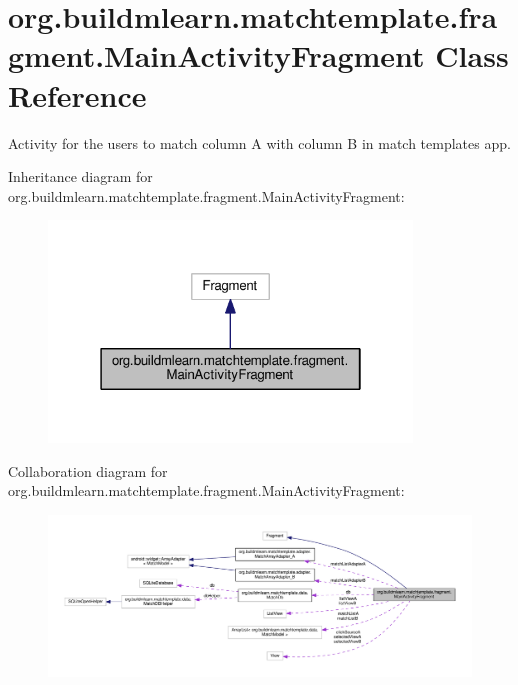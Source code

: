 \hypertarget{classorg_1_1buildmlearn_1_1matchtemplate_1_1fragment_1_1MainActivityFragment}{}\section{org.\+buildmlearn.\+matchtemplate.\+fragment.\+Main\+Activity\+Fragment Class Reference}
\label{classorg_1_1buildmlearn_1_1matchtemplate_1_1fragment_1_1MainActivityFragment}


Activity for the users to match column A with column B in match template\textquotesingle{}s app.  




Inheritance diagram for org.\+buildmlearn.\+matchtemplate.\+fragment.\+Main\+Activity\+Fragment\+:
\nopagebreak
\begin{figure}[H]
\begin{center}
\leavevmode
\includegraphics[width=274pt]{classorg_1_1buildmlearn_1_1matchtemplate_1_1fragment_1_1MainActivityFragment__inherit__graph}
\end{center}
\end{figure}


Collaboration diagram for org.\+buildmlearn.\+matchtemplate.\+fragment.\+Main\+Activity\+Fragment\+:
\nopagebreak
\begin{figure}[H]
\begin{center}
\leavevmode
\includegraphics[width=350pt]{classorg_1_1buildmlearn_1_1matchtemplate_1_1fragment_1_1MainActivityFragment__coll__graph}
\end{center}
\end{figure}
